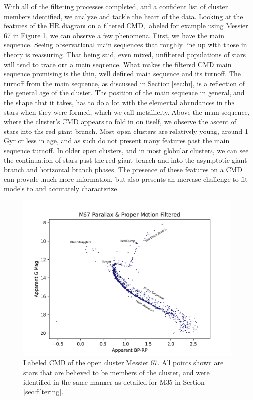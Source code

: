\documentclass[onecolumn,table,xcdraw,super]{aastex631}
\begin{document}
With all of the filtering processes completed, and a confident list of cluster members identified, we analyze and tackle the  heart of the data. Looking at the features of the HR diagram on a filtered CMD, labeled for example using Messier 67 in Figure \ref{fig:M67_cmd_filtered_labeled}, we can observe a few phenomena. First, we have the main sequence. Seeing observational main sequences that roughly line up with those in theory is reassuring. That being said, even mixed, unfiltered populations of stars will tend to trace out a main sequence. What makes the filtered CMD main sequence promising is the thin, well defined main sequence and its turnoff. The turnoff from the main sequence, as discussed in Section \ref{sec:hr}, is a reflection of the general age of the cluster. The position of the main sequence in general, and the shape that it takes, has to do a lot with the elemental abundances in the stars when they were formed, which we call metallicity. Above the main sequence, where the cluster's CMD appears to fold in on itself, we observe the ascent of stars into the red giant branch. Most open clusters are relatively young, around 1 Gyr or less in age, and as such do not present many features past the main sequence turnoff. In older open clusters, and in most globular clusters, we can see the continuation of stars past the red giant branch and into the asymptotic giant branch and horizontal branch phases. The presence of these features on a CMD can provide much more information, but also presents an increase challenge to fit models to and accurately characterize.

\begin{figure}[]
    \centering
      \includegraphics[width=4.75in]{figures/M67_cmd_filtered_labeled.png}
    \caption{Labeled CMD of the open cluster Messier 67. All points shown are stars that are believed to be members of the cluster, and were identified in the same manner as detailed for M35 in Section \ref{sec:filtering}.}
    \label{fig:M67_cmd_filtered_labeled}
\end{figure}
\end{document}
